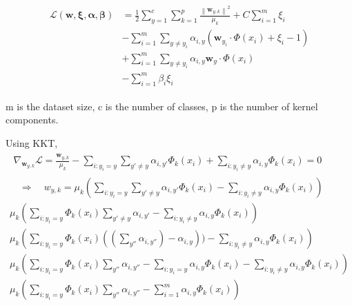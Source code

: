 \documentclass{article}
\begin{document}
\begin{align}
    \begin{aligned}
        \mathcal{L}(\mathbf{w}, \boldsymbol{\xi}, \bm{\alpha}, \bm{\beta}) 
        &= \frac{1}{2} \sum_{y=1}^{c} \sum_{k=1}^{p} \frac{\left\|\bm{w}_{y, k}\right\|^{2}}{\mu_{k}}
        + C \sum_{i=1}^{m} \xi_{i} \\
        &- \sum_{i=1}^{m} 
            \sum_{y \neq y_i}
            \alpha_{i, y}
            \left(
                \bm{w}_{y_{i}} \cdot \Phi\left(x_{i}\right)
                + \xi_{i} - 1
            \right)\\
        &+ \sum_{i=1}^{m} 
        \sum_{y \neq y_i}
        \alpha_{i, y} \bm{w}_{y} \cdot \Phi\left(x_{i}\right) \\
        &- \sum_{i=1}^{m} \beta_{i} \xi_{i}
    \end{aligned}
\end{align}




m is the dataset size, c is the number of classes, p is the number of kernel components.

Using KKT,
\begin{align}
    \begin{aligned}
        \nabla_{\bm{w}_{y, k}} \mathcal{L} = 
        \frac{\bm{w}_{y, k}}{\mu_k} - 
         \sum_{i: y_i = y} \sum_{y' \neq y} \alpha_{i, y'} \Phi_k(x_i)
        +\sum_{i: y_i \neq y}   \alpha_{i, y} \Phi_k(x_i) = 0
    \end{aligned} \\
    \quad \Longrightarrow \quad
    w_{y, k} = 
    \mu_k
    \left(
        \sum_{i: y_i = y} \sum_{y' \neq y} \alpha_{i, y'} \Phi_k(x_i) -\sum_{i: y_i \neq y}  \alpha_{i, y} \Phi_k(x_i)
    \right) \\
    \mu_k
    \left(
        \sum_{i: y_i = y} \Phi_k(x_i) 
        \sum_{y' \neq y} \alpha_{i, y'}  -\sum_{i: y_i \neq y}  \alpha_{i, y} \Phi_k(x_i) 
    \right) \\
    \mu_k
    \left(
        \sum_{i: y_i = y} \Phi_k(x_i) 
        ((\sum_{y''} \alpha_{i, y''}) - \alpha_{i, y})) 
        -\sum_{i: y_i \neq y}  \alpha_{i, y} \Phi_k(x_i) 
    \right) \\
    \mu_k
    \left(
        \sum_{i: y_i = y} \Phi_k(x_i) 
        \sum_{y''} \alpha_{i, y''}
        -\sum_{i: y_i = y}   \alpha_{i, y} \Phi_k(x_i)
        -\sum_{i: y_i \neq y}  \alpha_{i, y} \Phi_k(x_i) 
    \right) \\
    \mu_k
    \left(
        \sum_{i: y_i = y} \Phi_k(x_i) 
        \sum_{y''} \alpha_{i, y''}
        -\sum_{i=1}^{m}   \alpha_{i, y} \Phi_k(x_i)
    \right) 
\end{align}
\end{document}
